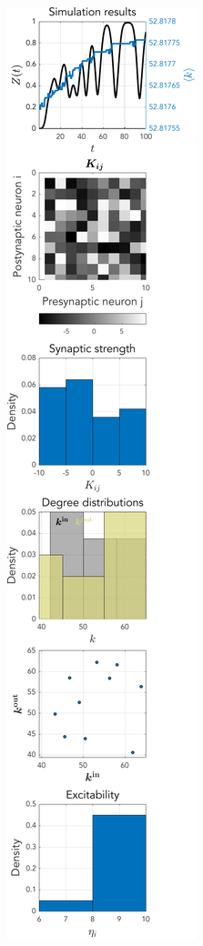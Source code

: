 \begin{figure}[H]
\centering
\begin{subfigure}[b]{0.32\linewidth}
   \centering
  \includegraphics[width=\linewidth, trim={0 0 0 0 },clip]{../Figures/Learning/STDPandIPKempter.pdf}

\end{subfigure}
\end{figure}
